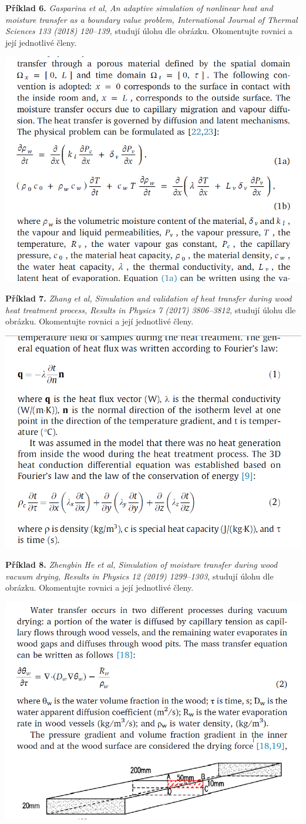\documentclass{article}
\let\oldtextbf\textbf
\def\textbf#1{%
  \oldtextbf{\color{red} #1}}
\begin{document}
  \newpage
    \textbf{Příklad 6.} 
\textit{  Gasparina et al, An adaptive simulation of nonlinear heat and
  moisture transfer as a boundary value problem, International Journal
  of Thermal Sciences 133 (2018) 120--139,} studují úlohu dle obrázku. Okomentujte rovnici a její jednotlivé členy.

{\centering
  \includegraphics[width=0.7\linewidth]{gasparina.png}

  }

  \newpage \textbf{Příklad 7.}
\textit{Zhang et al, Simulation and validation of heat transfer during wood heat treatment
process, Results in Physics 7 (2017) 3806--3812,} studují úlohu dle obrázku. Okomentujte rovnici a její jednotlivé členy.

{\centering
  \includegraphics[width=0.7\linewidth]{zhang.png}

  }
  \newpage \textbf{Příklad 8.}
  \textit{Zhengbin He et al, Simulation of moisture transfer during wood vacuum drying, Results in Physics 12 (2019) 1299--1303,} studují úlohu dle obrázku. Okomentujte rovnici a její jednotlivé členy.

{  \centering
  \includegraphics[width=0.7\linewidth]{he.png}

  }
\end{document}
